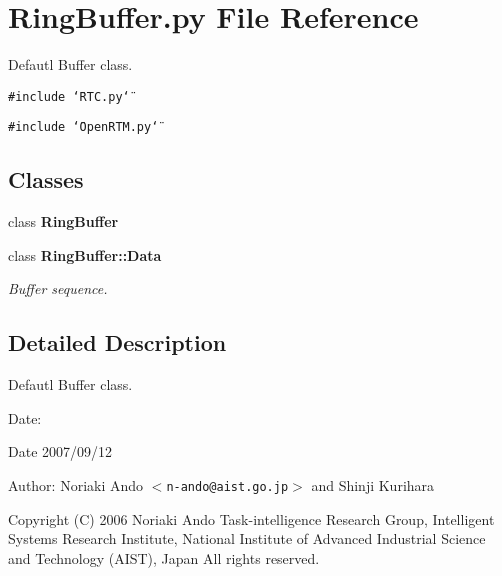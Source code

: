 \section{Ring\-Buffer.py File Reference}
\label{RingBuffer_8py}
Defautl Buffer class. 

{\tt \#include \char`\"{}RTC.py\char`\"{}}\par
{\tt \#include \char`\"{}Open\-RTM.py\char`\"{}}\par
\subsection*{Classes}
\begin{CompactItemize}
\item 
class {\bf Ring\-Buffer}
\item 
class {\bf Ring\-Buffer::Data}
\begin{CompactList}\small\item\em Buffer sequence. \item\end{CompactList}\end{CompactItemize}


\subsection{Detailed Description}
Defautl Buffer class. 

\begin{Desc}
\item[Date:]\begin{Desc}
\item[Date]2007/09/12 \end{Desc}
\end{Desc}
\begin{Desc}
\item[Author:]Noriaki Ando $<${\tt n-ando@aist.go.jp}$>$ and Shinji Kurihara\end{Desc}
Copyright (C) 2006 Noriaki Ando Task-intelligence Research Group, Intelligent Systems Research Institute, National Institute of Advanced Industrial Science and Technology (AIST), Japan All rights reserved.